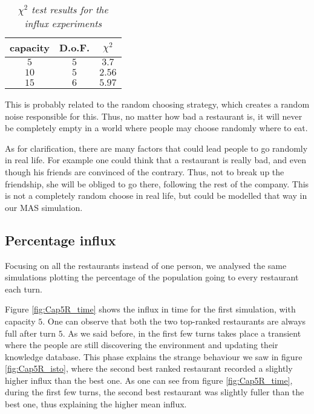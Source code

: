 \documentclass[10pt,a4paper,usenatbib]{article}
\begin{document}
\begin{table}[!htb]
\centering
\begin{tabular}{ccc}
\hline
capacity & D.o.F. & $\chi^2$\\ \hline
$5$ & $5$ & $3.7$\\
$10$ & $5$ & $2.56$\\
$15$ & $6$ & $5.97$\\ \hline
\end{tabular}
\caption{\small \textit{$\chi^2$ test results for the influx experiments}}
\label{tab:chi_perc}
\end{table}

This is probably related to the random choosing strategy, which creates a random noise responsible for this. Thus, no matter how bad a restaurant is, it will never be completely empty in a world where people  may choose randomly where to eat.

As for clarification, there are many factors that could lead people to go randomly in real life. For example one could think that a restaurant is really bad, and even though his friends are convinced of the contrary. Thus, not to break up the friendship, she will be obliged to go there, following the rest of the company. This is not a completely random choose in real life, but could be modelled that way in our MAS simulation.

\subsection{Percentage influx}
\label{subsec:perc_influx}

Focusing on all the restaurants instead of one person, we analysed the same simulations plotting the percentage of the population going to every restaurant each turn. 

Figure \ref{fig:Cap5R_time} shows the influx in time for the first simulation, with capacity $5$. One can observe that both the two top-ranked restaurants are always full after turn $5$. As we said before, in the first few turns takes place a transient where the people are still discovering the environment and updating their knowledge database. This phase explains the strange behaviour  we saw in figure \ref{fig:Cap5R_isto}, where the second best ranked restaurant recorded a slightly higher influx than the best one. As one can see from figure \ref{fig:Cap5R_time}, during the first few turns, the second best restaurant was slightly fuller than the best one, thus explaining the higher mean influx. 
\end{document}
